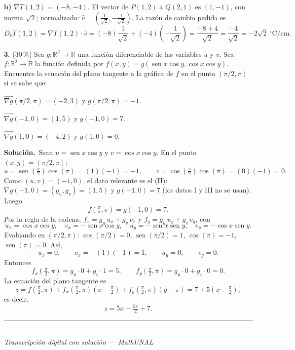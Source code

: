 \documentclass[11pt]{article}
\newcommand{\sol}{\medskip\noindent\textbf{\textcolor{solgreen}{Soluci\'on.}}\ }
\newcommand{\examfooter}{%
  \vfill
  \rule{\linewidth}{0.4pt}\\[1pt]
  {\scriptsize\textit{Transcripci\'on digital con soluci\'on --- MathUNAL}\hfill\textcolor{unalblue}{\textbf{\thepage}}}
}
\begin{document}
\textbf{b)} $\nabla T(1,2) = (-8,-4)$. El vector de $P(1,2)$ a $Q(2,1)$ es $(1,-1)$, con norma $\sqrt2$; normalizado: $\hat v = \left(\frac{1}{\sqrt2},-\frac{1}{\sqrt2}\right)$. La raz\'on de cambio pedida es
$$D_{\hat v}T(1,2) = \nabla T(1,2)\cdot \hat v = (-8)\frac{1}{\sqrt2} + (-4)\left(-\frac{1}{\sqrt2}\right) = \frac{-8+4}{\sqrt2} = \frac{-4}{\sqrt2} = -2\sqrt2\ {}^{\circ}\text{C/cm}.$$

\bigskip
\noindent\textbf{3.} (30\,\%) Sea $g:\mathbb{R}^2\to\mathbb{R}$ una funci\'on diferenciable de las variables $u$ y $v$. Sea $f:\mathbb{R}^2\to\mathbb{R}$ la funci\'on definida por $f(x,y)=g(\operatorname{sen}x\cos y,\cos x\cos y)$. Encuentre la ecuaci\'on del plano tangente a la gr\'afica de $f$ en el punto $(\pi/2,\pi)$ si se sabe que:
\begin{romopc}
  \item $\overrightarrow{\nabla g}(\pi/2,\pi) = (-2,3)$ y $g(\pi/2,\pi)=-1$.
  \item $\overrightarrow{\nabla g}(-1,0) = (1,5)$ y $g(-1,0)=7$.
  \item $\overrightarrow{\nabla g}(1,0) = (-4,2)$ y $g(1,0)=0$.
\end{romopc}

\sol Sean $u=\operatorname{sen}x\cos y$ y $v=\cos x\cos y$. En el punto $(x,y)=(\pi/2,\pi)$:
$$u = \operatorname{sen}\left(\tfrac{\pi}{2}\right)\cos(\pi) = (1)(-1) = -1, \qquad v = \cos\left(\tfrac{\pi}{2}\right)\cos(\pi) = (0)(-1) = 0.$$
Como $(u,v)=(-1,0)$, el dato relevante es el (II): $\nabla g(-1,0)=(g_u,g_v)=(1,5)$ y $g(-1,0)=7$ (los datos I y III no se usan). Luego
$$f\left(\tfrac{\pi}{2},\pi\right) = g(-1,0) = 7.$$
Por la regla de la cadena, $f_x = g_u\,u_x + g_v\,v_x$ y $f_y = g_u\,u_y + g_v\,v_y$, con
$$u_x=\cos x\cos y,\quad v_x=-\operatorname{sen}x\cos y,\quad u_y=-\operatorname{sen}x\operatorname{sen}y,\quad v_y=-\cos x\operatorname{sen}y.$$
Evaluando en $(\pi/2,\pi)$: $\cos(\pi/2)=0$, $\operatorname{sen}(\pi/2)=1$, $\cos(\pi)=-1$, $\operatorname{sen}(\pi)=0$. As\'i,
$$u_x = 0, \qquad v_x = -(1)(-1) = 1, \qquad u_y = 0, \qquad v_y = 0.$$
Entonces
$$f_x\left(\tfrac{\pi}{2},\pi\right) = g_u\cdot 0 + g_v\cdot 1 = 5, \qquad f_y\left(\tfrac{\pi}{2},\pi\right) = g_u\cdot 0 + g_v\cdot 0 = 0.$$
La ecuaci\'on del plano tangente es
$$z = f\left(\tfrac{\pi}{2},\pi\right) + f_x\left(\tfrac{\pi}{2},\pi\right)\left(x-\tfrac{\pi}{2}\right) + f_y\left(\tfrac{\pi}{2},\pi\right)(y-\pi) = 7 + 5\left(x-\tfrac{\pi}{2}\right),$$
es decir,
$$z = 5x - \tfrac{5\pi}{2} + 7.$$

\vfill
\examfooter
\end{document}
